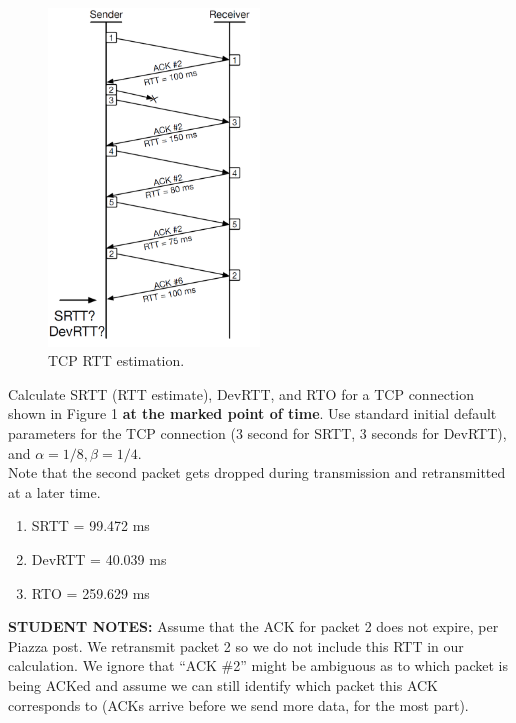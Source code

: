 \documentclass{report}
\begin{document}
\mktitle


\begin{problem}
\begin{figure}[!ht]
	\centering
	\includegraphics[valign=T,width=0.5\textwidth]{image1.png}
	\caption{TCP RTT estimation.}
	\centering
	\label{fig:image1}
\end{figure}

Calculate SRTT (RTT estimate), DevRTT, and RTO for a TCP connection shown in
Figure 1 \textbf{at the marked point of time}. Use standard initial default
parameters for the TCP connection (3 second for SRTT, 3 seconds for DevRTT),
and $\alpha = 1/8, \beta = 1/4$.\\
\indent Note that the second packet gets dropped during transmission and
retransmitted at a later time.

\begin{enumerate}
	\item SRTT = 99.472 ms
	\item DevRTT = 40.039 ms
	\item RTO = 259.629 ms
\end{enumerate}

\textbf{STUDENT NOTES:} Assume that the ACK for packet 2 does not expire, per
Piazza post. We retransmit packet 2 so we do not include this RTT in our
calculation. We ignore that ``ACK \#2'' might be ambiguous as to which packet is
being ACKed and assume we can still identify which packet this ACK corresponds
to (ACKs arrive before we send more data, for the most part).

\end{problem}
\end{document}
